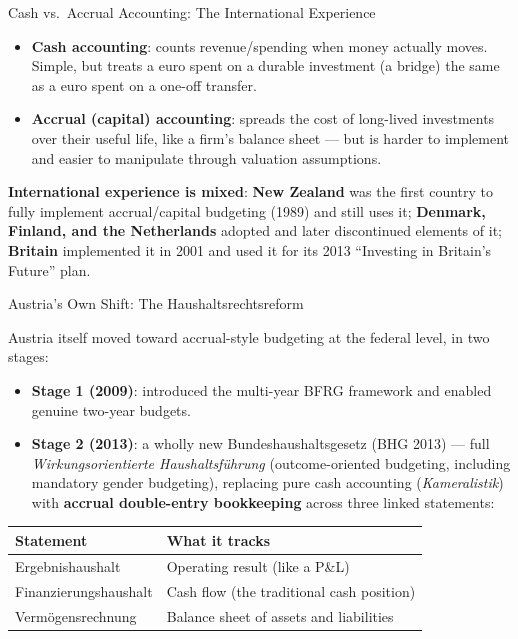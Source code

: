 \documentclass[11pt,aspectratio=169]{beamer}
\begin{document}
\begin{frame}{Cash vs.\ Accrual Accounting: The International Experience}
 
  \begin{itemize}
    \item \textbf{Cash accounting}: counts revenue/spending when money actually moves. Simple, but treats a euro spent on a durable investment (a bridge) the same as a euro spent on a one-off transfer.
    \item \textbf{Accrual (capital) accounting}: spreads the cost of long-lived investments over their useful life, like a firm's balance sheet --- but is harder to implement and easier to manipulate through valuation assumptions.
  \end{itemize}
  \vspace{0.3em}
  \textbf{International experience is mixed}: \textbf{New Zealand} was the first country to fully implement accrual/capital budgeting (1989) and still uses it; \textbf{Denmark, Finland, and the Netherlands} adopted and later discontinued elements of it; \textbf{Britain} implemented it in 2001 and used it for its 2013 ``Investing in Britain's Future'' plan.
 
\end{frame}

\begin{frame}{Austria's Own Shift: The Haushaltsrechtsreform}
 
  Austria itself moved toward accrual-style budgeting at the federal level, in two stages:
  \begin{itemize}
    \item \textbf{Stage 1 (2009)}: introduced the multi-year BFRG framework and enabled genuine two-year budgets.
    \item \textbf{Stage 2 (2013)}: a wholly new Bundeshaushaltsgesetz (BHG 2013) --- full \emph{Wirkungsorientierte Haushaltsführung} (outcome-oriented budgeting, including mandatory gender budgeting), replacing pure cash accounting (\emph{Kameralistik}) with \textbf{accrual double-entry bookkeeping} across three linked statements:
  \end{itemize}
  \vspace{0.2em}
  \begin{center}
  \begin{tabular}{@{}ll@{}}
    \toprule
    \textbf{Statement} & \textbf{What it tracks} \\
    \midrule
    Ergebnishaushalt & Operating result (like a P\&L) \\
    Finanzierungshaushalt & Cash flow (the traditional cash position) \\
    Vermögensrechnung & Balance sheet of assets and liabilities \\
    \bottomrule
  \end{tabular}
  \end{center}
 
\end{frame}
\end{document}
